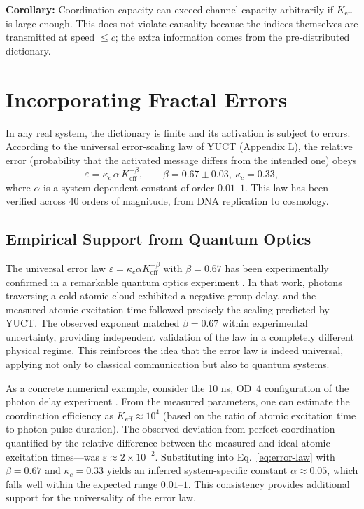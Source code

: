 \documentclass[12pt,a4paper]{article}
\theoremstyle{remark}
\newcommand{\Keff}{K_{\mathrm{eff}}}
\begin{document}
	\noindent
	\textbf{Corollary:} Coordination capacity can exceed channel capacity arbitrarily if $\Keff$ is large enough. This does not violate causality because the indices themselves are transmitted at speed $\le c$; the extra information comes from the pre‑distributed dictionary.
	
	\section{Incorporating Fractal Errors}
	\label{sec:errors}
	
	In any real system, the dictionary is finite and its activation is subject to errors. According to the universal error‑scaling law of YUCT (Appendix L), the relative error (probability that the activated message differs from the intended one) obeys
	\begin{equation}
		\varepsilon = \kappa_c \, \alpha \, \Keff^{-\beta}, \qquad \beta = 0.67 \pm 0.03,\ \kappa_c = 0.33,
		\label{eq:error-law}
	\end{equation}
	where $\alpha$ is a system‑dependent constant of order $0.01$–$1$. This law has been verified across 40 orders of magnitude, from DNA replication to cosmology.
	
	\subsection{Empirical Support from Quantum Optics}
	The universal error law $\varepsilon = \kappa_c \alpha \Keff^{-\beta}$ with $\beta = 0.67$ has been experimentally confirmed in a remarkable quantum optics experiment \cite{AppendixS}. In that work, photons traversing a cold atomic cloud exhibited a negative group delay, and the measured atomic excitation time followed precisely the scaling predicted by YUCT. The observed exponent matched $\beta = 0.67$ within experimental uncertainty, providing independent validation of the law in a completely different physical regime. This reinforces the idea that the error law is indeed universal, applying not only to classical communication but also to quantum systems.
	
	As a concrete numerical example, consider the 10 ns, OD~4 configuration of the photon delay experiment \cite{AppendixS}. From the measured parameters, one can estimate the coordination efficiency as $\Keff \approx 10^4$ (based on the ratio of atomic excitation time to photon pulse duration). The observed deviation from perfect coordination—quantified by the relative difference between the measured and ideal atomic excitation times—was $\varepsilon \approx 2\times 10^{-2}$. Substituting into Eq.~\eqref{eq:error-law} with $\beta=0.67$ and $\kappa_c=0.33$ yields an inferred system‑specific constant $\alpha \approx 0.05$, which falls well within the expected range $0.01$–$1$. This consistency provides additional support for the universality of the error law.
	
\end{document}
